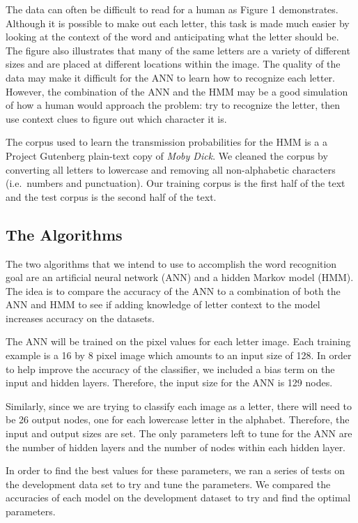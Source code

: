 \documentclass[11pt,a4paper,twocolumn]{article}
\begin{document}
The data can often be difficult to read for a human as Figure 1 demonstrates.
Although it is possible to make out each letter, this task is made much
easier by looking at the context of the word and anticipating what the letter
should be. The figure also illustrates that many of the same letters are a
variety of different sizes and are placed at different locations within the
image. The quality of the data may make it difficult for the ANN to learn how
to recognize each letter. However, the combination of the ANN and the HMM may
be a good simulation of how a human would approach the problem: try to
recognize the letter, then use context clues to figure out which character it
is.

The corpus used to learn the transmission probabilities for the HMM is a
a Project Gutenberg plain-text copy of \emph{Moby Dick}. We cleaned the
corpus by converting all letters to lowercase and removing all non-alphabetic
characters (i.e.\ numbers and punctuation). Our training corpus is the first
half of the text and the test corpus is the second half of the text.

\subsection*{The Algorithms}

The two algorithms that we intend to use to accomplish the word
recognition goal are an artificial neural network (ANN) and a hidden Markov
model (HMM). The idea is to compare the accuracy of the ANN to a combination of
both the ANN and HMM to see if adding knowledge of letter context to the model
increases accuracy on the datasets.

The ANN will be trained on the pixel values for each letter image. Each
training example is a 16 by 8 pixel image which amounts to an input size of
128. In order to help improve the accuracy of the classifier, we included a
bias term on the input and hidden layers. Therefore, the input size for the ANN
is 129 nodes.

Similarly, since we are trying to classify each image as a letter, there will
need to be 26 output nodes, one for each lowercase letter in the alphabet.
Therefore, the input and output sizes are set. The only parameters left to tune
for the ANN are the number of hidden layers and the number of nodes within each
hidden layer.

In order to find the best values for these parameters, we ran a series of tests
on the development data set to try and tune the parameters. We compared the
accuracies of each model on the development dataset to try and find the optimal
parameters.
\end{document}
